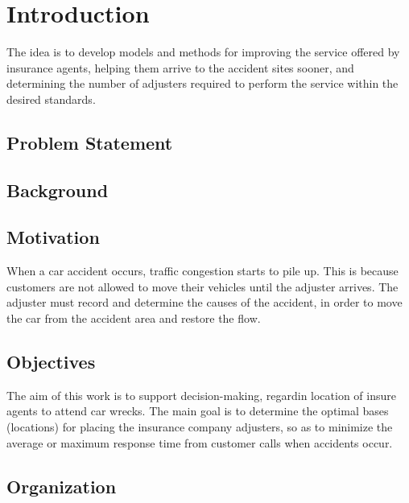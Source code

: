 \chapter{Introduction}

The idea is to develop models and methods for improving the service
offered by insurance agents, helping them arrive to the accident sites
sooner, and determining the number of adjusters required to perform
the service within the desired standards.

\section{Problem Statement}

\section{Background}

\section{Motivation}
When a car accident occurs, traffic congestion starts to pile up. This is
because customers are not allowed to move their vehicles until the
adjuster arrives. The adjuster must record and determine the causes of
the accident, in order to move the car from the accident area and restore
the flow.

\section{Objectives}
The aim of this work is to support decision-making, 
regardin location of insure agents to attend car wrecks.
The main goal is to determine the optimal bases (locations) for placing
the insurance company adjusters, so as to minimize the average or
maximum response time from customer calls when accidents occur.

\section{Organization}

